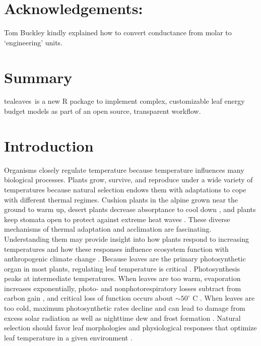 \documentclass[11pt, oneside]{article}
\newcommand{\pkg}[1]{{\fontseries{b}\selectfont #1}}
\newcommand{\tealeaves}{\pkg{tealeaves}}
\begin{document}
\section*{Acknowledgements:}  

Tom Buckley kindly explained how to convert conductance from molar to `engineering' units.

\clearpage


\onehalfspacing

\section*{Summary}

\tealeaves~is a new R package to implement complex, customizable leaf energy budget models as part of an open source, transparent workflow.

\section*{Introduction}


Organisms closely regulate temperature because temperature influences many biological processes. Plants grow, survive, and reproduce under a wide variety of temperatures because natural selection endows them with adaptations to cope with different thermal regimes. Cushion plants in the alpine grown near the ground to warm up, desert plants decrease absorptance to cool down \citep{Ehleringer_etal_1976}, and plants keep stomata open to protect against extreme heat waves \citep{Drake_etal_2018}. These diverse mechanisms of thermal adaptation and acclimation are fascinating. Understanding them may provide insight into how plants respond to increasing temperatures and how these responses influence ecosystem function with anthropogenic climate change \citep{Rogers_etal_2017}. Because leaves are the primary photosynthetic organ in most plants, regulating leaf temperature is critical \citep{Berry_Bjorkman_1980}. Photosynthesis peaks at intermediate temperatures\citep{Sage_Kubien_2007}. When leaves are too warm, evaporation increases exponentially, photo- and nonphotorespiratory losses subtract from carbon gain \citep{Jones_2014}, and critical loss of function occurs about $\sim 50^{\circ}$ C \citep{Osullivan_etal_2017}. When leaves are too cold, maximum photosynthetic rates decline and can lead to damage from excess solar radiation \citep{Huner_etal_1993} as well as nighttime dew and frost formation \citep{Jordan_Smith_1994}. Natural selection should favor leaf morphologies and physiological responses that optimize leaf temperature in a given environment \citep{Parkhurst_Loucks_1972, Okajima_etal_2012, Michaletz_etal_2016}.
\end{document}
